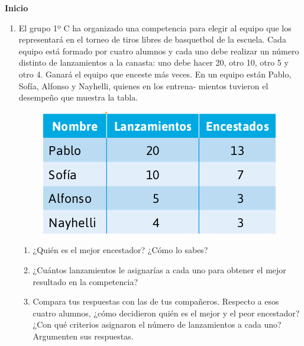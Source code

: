 \documentclass[11pt]{book}
\begin{document}
\begin{boxK}
  \begin{center}\textbf{Inicio}\end{center}
  \begin{enumerate}
    \item El grupo 1º C ha organizado una competencia para elegir al equipo que los
          representará en el torneo de tiros libres de basquetbol de la escuela. Cada
          equipo está formado por cuatro alumnos y cada uno debe realizar un número distinto de lanzamientos a la canasta: uno debe hacer 20, otro 10, otro 5 y
          otro 4. Ganará el equipo que enceste más veces.
          En un equipo están Pablo, Sofía, Alfonso y Nayhelli, quienes en los entrena-
          mientos tuvieron el desempeño que muestra la tabla.
          \begin{figure}[H]
            \centering
            \includegraphics[width=0.4\linewidth]{tabla_lanzamientos.png}
            \label{fig:tabla_lanzamientos}
          \end{figure}
          \begin{enumerate}
            \item ¿Quién es el mejor encestador? ¿Cómo lo sabes?
            \item ¿Cuántos lanzamientos le asignarías a cada uno para obtener el mejor resultado en la competencia?
            \item Compara tus respuestas con las de tus compañeros. Respecto a
                  esos cuatro alumnos, ¿cómo decidieron quién es el mejor y el
                  peor encestador? ¿Con qué criterios asignaron el número de
                  lanzamientos a cada uno? Argumenten sus respuestas.
          \end{enumerate}

  \end{enumerate}
\end{boxK}
\end{document}
